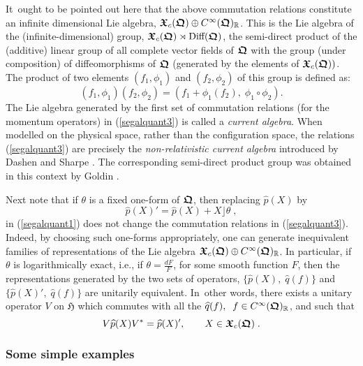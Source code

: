 \documentclass[12pt]{amsart}
\numberwithin{equation}{section}
\theoremstyle{remark}
\newcommand\HH{\mathfrak H}
\newcommand\RR{\mathbb R}
\newcommand{\be}{\begin{equation}}
\newcommand{\en}{\end{equation}}
\newcommand{\bfrakQ}{\mbox{\boldmath $\mathfrak Q$}}
\newcommand{\bfrakX}{\mbox{\boldmath $\mathfrak X$}}
\newcommand{\CinfRQ}{C^\infty(\bfrakQ)_{\RR}}
\begin{document}
It~ought to be pointed out here that the above commutation relations constitute
an  infinite dimensional Lie algebra, $\bfrakX_c (\bfrakQ )\oplus\CinfRQ$. This
is the Lie algebra of the
(infinite-dimensional) group, $\bfrakX_c (\bfrakQ )\rtimes \mbox{\rm Diff}
(\bfrakQ )$, the semi-direct product of the (additive) linear group of all
complete vector fields of $\bfrakQ$ with the group (under composition) of
diffeomorphisms of $\bfrakQ$ (generated by the elements of
$\bfrakX_c(\bfrakQ))$. The product of two elements $(f_1 , \phi_1 )$ and $(f_2
, \phi_2 )$ of this group is defined as:
$$ (f_1 , \phi_1 )(f_2 , \phi_2 ) = (f_1 + \phi_1 (f_2 ) ,\;
 \phi_1 \circ \phi_2 ) .$$
The Lie algebra generated by the first set of commutation relations (for the
momentum operators) in (\ref{segalquant3}) is called a {\em current algebra}.
When modelled on the physical space, rather than the configuration space, the
relations (\ref{segalquant3}) are precisely the {\em non-relativistic current algebra}
introduced by Dashen and Sharpe \cite{bib:DasShar}. The corresponding semi-direct product group
was obtained in this context by Goldin \cite{bib:gol1}.

   Next note that if $\theta$ is a fixed
one-form of $\bfrakQ$, then replacing $\widehat{p}(X)$ by
\be
 \widehat{p}(X)' = \widehat{p}(X) + X\rfloor\theta \;,
\label{equivrep}
\en
in (\ref{segalquant1}) does not change the commutation relations in
(\ref{segalquant3}). Indeed, by choosing such one-forms appropriately, one can
generate inequivalent families of representations of the Lie algebra
$\bfrakX_c (\bfrakQ )\oplus \CinfRQ$. In particular, if $\theta$ is
logarithmically exact, i.e., if $\theta = \frac {dF}F$, for some smooth
function $F$, then the representations  generated by the two sets of operators,
$\{\widehat{p}(X), \; \widehat{q}(f)\}$ and
$\{\widehat{p}(X)', \; \widehat{q}(f)\}$ are unitarily equivalent. In~other
words, there exists a unitary operator $V$ on $\HH$ which commutes with all
the $\widehat{q}(f), \;\; f \in \CinfRQ$, and such that
$$ V \widehat{p}(X)V^* = \widehat{p}(X)' ,
 \qquad X \in \bfrakX_c (\bfrakQ )\; . $$


\subsubsection*{Some simple examples}
\end{document}
